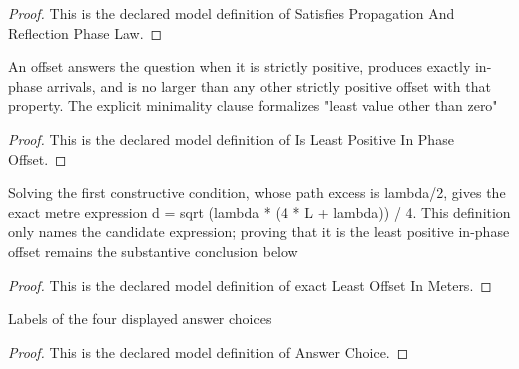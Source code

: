 \begin{proof}
  This is the declared model definition of Satisfies Propagation And Reflection Phase Law.
\end{proof}
\begin{definition}
  \label{def:physics:phyx-mini-0323:phyxminiproblems-problemphyxmini0323-isleastpositiveinphaseoffset}
  An offset answers the question when it is strictly positive, produces exactly in-phase arrivals, and is no larger than any other strictly positive offset with that property. The explicit minimality clause formalizes "least value other than zero"
\end{definition}
\begin{proof}
  This is the declared model definition of Is Least Positive In Phase Offset.
\end{proof}
\begin{definition}
  \label{def:physics:phyx-mini-0323:phyxminiproblems-problemphyxmini0323-exactleastoffsetinmeters}
  Solving the first constructive condition, whose path excess is lambda/2, gives the exact metre expression d = sqrt (lambda * (4 * L + lambda)) / 4. This definition only names the candidate expression; proving that it is the least positive in-phase offset remains the substantive conclusion below
\end{definition}
\begin{proof}
  This is the declared model definition of exact Least Offset In Meters.
\end{proof}
\begin{definition}
  \label{def:physics:phyx-mini-0323:phyxminiproblems-problemphyxmini0323-answerchoice}
  Labels of the four displayed answer choices
\end{definition}
\begin{proof}
  This is the declared model definition of Answer Choice.
\end{proof}
